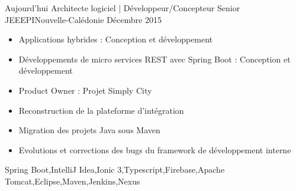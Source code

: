 
\begin{experiences}
  \experience
    {Aujourd'hui}   {Architecte logiciel | Développeur/Concepteur Senior JEE}{EPI}{Nouvelle-Calédonie}
    {Décembre 2015} {
                      \begin{itemize}
                        \item Applications hybrides : Conception et développement
                        \item Développements de micro services REST avec Spring Boot : Conception et développement
                        \item Product Owner : Projet Simply City
                        \item Reconstruction de la plateforme d'intégration
                        \item Migration des projets Java sous Maven
                        \item Evolutions et corrections des bugs du framework de développement interne
                      \end{itemize}
                    }
                    {Spring Boot,IntelliJ Idea,Ionic 3,Typescript,Firebase,Apache Tomcat,Eclipse,Maven,Jenkins,Nexus}
\end{experiences}
